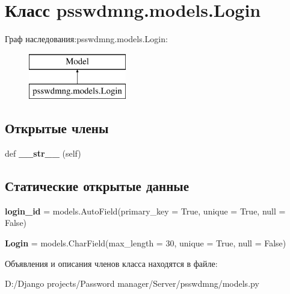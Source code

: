 \section{Класс psswdmng.\+models.\+Login}
\label{classpsswdmng_1_1models_1_1_login}
Граф наследования\+:psswdmng.\+models.\+Login\+:\begin{figure}[H]
\begin{center}
\leavevmode
\includegraphics[height=2.000000cm]{classpsswdmng_1_1models_1_1_login}
\end{center}
\end{figure}
\subsection*{Открытые члены}
\begin{DoxyCompactItemize}
\item 
\mbox{\label{classpsswdmng_1_1models_1_1_login_a595d66e4b975623561d837fd69a5a3f3}} 
def {\bfseries \+\_\+\+\_\+str\+\_\+\+\_\+} (self)
\end{DoxyCompactItemize}
\subsection*{Статические открытые данные}
\begin{DoxyCompactItemize}
\item 
\mbox{\label{classpsswdmng_1_1models_1_1_login_adb099fdea5d4e4936db21c5950f9c0de}} 
{\bfseries login\+\_\+id} = models.\+Auto\+Field(primary\+\_\+key = True, unique = True, null = False)
\item 
\mbox{\label{classpsswdmng_1_1models_1_1_login_ac36a5e6fac4a7ada325fe58e0d69533b}} 
{\bfseries Login} = models.\+Char\+Field(max\+\_\+length = 30, unique = True, null = False)
\end{DoxyCompactItemize}


Объявления и описания членов класса находятся в файле\+:\begin{DoxyCompactItemize}
\item 
D\+:/\+Django projects/\+Password manager/\+Server/psswdmng/models.\+py\end{DoxyCompactItemize}
